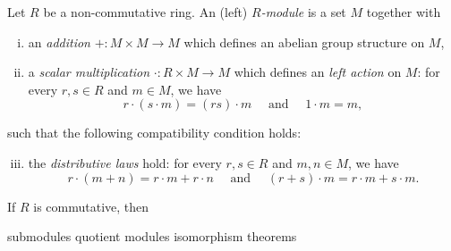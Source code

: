 \documentclass{../../large}
\begin{document}
\begin{prb}
Let $R$ be a non-commutative ring.
An (left) \emph{$R$-module} is a set $M$ together with 
\begin{enumerate}[(i)]
\item an \emph{addition} $+:M\times M\to M$ which defines an abelian group structure on $M$,
\item a \emph{scalar multiplication} $\cdot:R\times M\to M$ which defines an \emph{left action} on $M$: for every $r,s\in R$ and $m\in M$, we have
\[r\cdot(s\cdot m)=(rs)\cdot m\quad\text{ and }\quad1\cdot m=m,\]
\end{enumerate}
such that the following compatibility condition holds:
\begin{enumerate}[(i)]\setcounter{enumi}{2}
\item the \emph{distributive laws} hold: for every $r,s\in R$ and $m,n\in M$, we have
\[r\cdot (m+n)=r\cdot m+r\cdot n\quad\text{ and }\quad(r+s)\cdot m=r\cdot m+s\cdot m.\]
\end{enumerate}
\begin{parts}
\item If $R$ is commutative, then
\end{parts}
\end{prb}

submodules
quotient modules
isomorphism theorems
\end{document}
